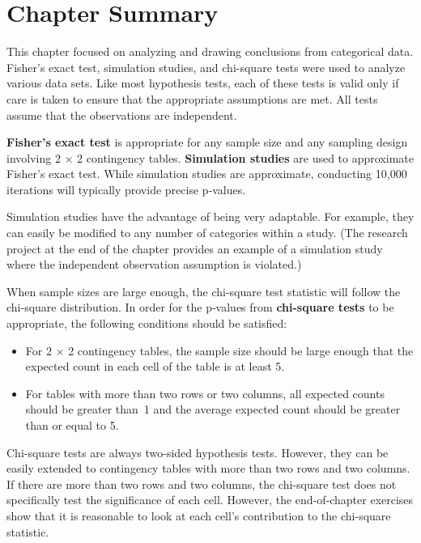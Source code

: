 \documentclass[
]{report}
\providecommand{\tightlist}{%
  \setlength{\itemsep}{0pt}\setlength{\parskip}{0pt}}
\begin{document}
\section{\texorpdfstring{\textbf{Chapter Summary}}{Chapter Summary}}\label{chapter-summary-1}

This chapter focused on analyzing and drawing conclusions from categorical data. Fisher's exact test, simulation studies, and chi-square tests were used to analyze various data sets. Like most hypothesis tests, each of these tests is valid only if care is taken to ensure that the appropriate assumptions are met. All tests assume that the observations are independent.

\textbf{Fisher's exact test} is appropriate for any sample size and any sampling design involving 2 × 2 contingency tables. \textbf{Simulation studies} are used to approximate Fisher's exact test. While simulation studies are approximate, conducting 10,000 iterations will typically provide precise p‑values.

Simulation studies have the advantage of being very adaptable. For example, they can easily be modified to any number of categories within a study. (The research project at the end of the chapter provides an example of a simulation study where the independent observation assumption is violated.)

When sample sizes are large enough, the chi-square test statistic will follow the chi-square distribution. In order for the p‑values from \textbf{chi-square tests} to be appropriate, the following conditions should be satisfied:

\begin{itemize}
\tightlist
\item
  For 2 × 2 contingency tables, the sample size should be large enough that the expected count in each cell of the table is at least 5.
\item
  For tables with more than two rows or two columns, all expected counts should be greater than~1 and the average expected count should be greater than or equal to 5.
\end{itemize}

Chi-square tests are always two‑sided hypothesis tests. However, they can be easily extended to contingency tables with more than two rows and two columns. If there are more than two rows and two columns, the chi-square test does not specifically test the significance of each cell. However, the end‑of‑chapter exercises show that it is reasonable to look at each cell's contribution to the chi-square statistic.
\end{document}
